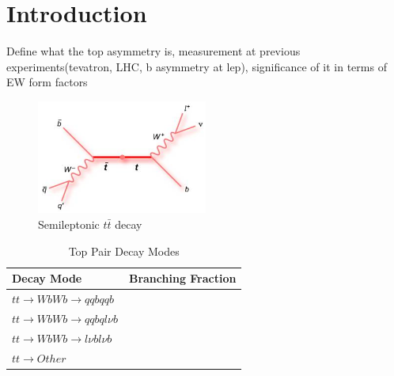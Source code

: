 \section{Introduction}
Define what the top asymmetry is, measurement at previous experiments(tevatron, LHC, b asymmetry at lep), significance of it in terms of EW form factors


\begin{figure}
  \centering
  \includegraphics[width=0.5\textwidth]{figures/TopFeynmann.jpg}
  \caption[Semileptonic $t\bar{t}$ decay]{Semileptonic $t\bar{t}$ decay}
  \label{fig:topfeynmann}
\end{figure}

\begin{table}
  \centering
  \begin{tabular}{l |p{120mm}}
    \toprule
    Decay Mode     & Branching Fraction  \\
    \midrule
    $tt\rightarrow WbWb\rightarrow qqbqqb$ & \\
    \midrule
    $tt\rightarrow WbWb\rightarrow qqbql\nu b$ & \\
    \midrule
    $tt\rightarrow WbWb\rightarrow l\nu bl\nu b$ & \\
    \midrule
    $tt\rightarrow Other$ & \\
    \bottomrule
  \end{tabular}
  \caption{Top Pair Decay Modes}
  \label{table:topdecaymodes}
\end{table}



